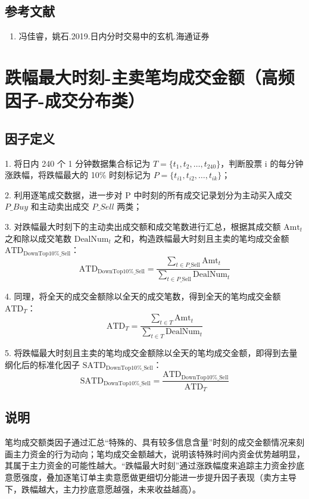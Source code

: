 \documentclass{article}
\begin{document}
\subsection{参考文献}
\begin{enumerate}
    \item 冯佳睿，姚石.2019.日内分时交易中的玄机.海通证券
\end{enumerate}

\section{跌幅最大时刻-主卖笔均成交金额（高频因子-成交分布类）}

\subsection{因子定义}


1. 将日内 240 个 1 分钟数据集合标记为 \( T = \{t_1, t_2, \dots, t_{240}\} \)，判断股票 i 的每分钟涨跌幅，将跌幅最大的 10\% 时刻标记为 \( P = \{t_{i1}, t_{i2}, \dots, t_{ik}\} \)；

2. 利用逐笔成交数据，进一步对 P 中时刻的所有成交记录划分为主动买入成交 \( P\_Buy \) 和主动卖出成交 \( P\_Sell \) 两类；

3. 对跌幅最大时刻下的主动卖出成交额和成交笔数进行汇总，根据其成交额 \( \mathrm{Amt}_t \) 之和除以成交笔数 \( \mathrm{DealNum}_t \) 之和，构造跌幅最大时刻且主卖的笔均成交金额 \( \mathrm{ATD}_{\mathrm{DownTop10\%\_Sell}} \)：
\begin{equation}
    \mathrm{ATD}_{\mathrm{DownTop10\%\_Sell}} = \frac{\sum_{t \in P\_\mathrm{Sell}} \mathrm{Amt}_t}{\sum_{t \in P\_\mathrm{Sell}} \mathrm{DealNum}_t}
\end{equation}

4. 同理，将全天的成交金额除以全天的成交笔数，得到全天的笔均成交金额 \( \mathrm{ATD}_T \)：
\begin{equation}
    \mathrm{ATD}_T = \frac{\sum_{t \in T} \mathrm{Amt}_t}{\sum_{t \in T} \mathrm{DealNum}_t}
\end{equation}

5. 将跌幅最大时刻且主卖的笔均成交金额除以全天的笔均成交金额，即得到去量纲化后的标准化因子 \( \mathrm{SATD}_{\mathrm{DownTop10\%\_Sell}} \)：
\begin{equation}
    \mathrm{SATD}_{\mathrm{DownTop10\%\_Sell}} = \frac{\mathrm{ATD}_{\mathrm{DownTop10\%\_Sell}}}{\mathrm{ATD}_T}
\end{equation}

\subsection{说明}
笔均成交额类因子通过汇总“特殊的、具有较多信息含量”时刻的成交金额情况来刻画主力资金的行为动向；笔均成交金额越大，说明该特殊时间内资金优势越明显，其属于主力资金的可能性越大。“跌幅最大时刻”通过涨跌幅度来追踪主力资金抄底意愿强度，叠加逐笔订单主卖意愿做更细切分能进一步提升因子表现（卖方主导下，跌幅越大，主力抄底意愿越强，未来收益越高）。
\end{document}
